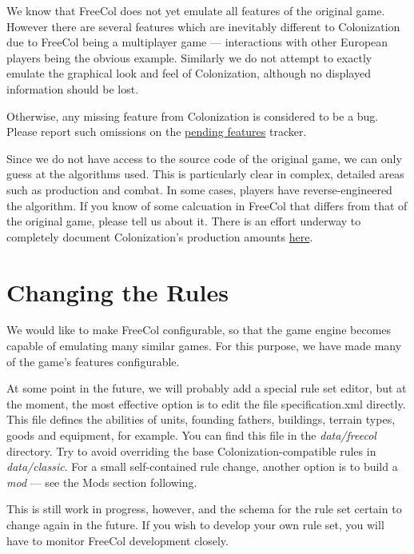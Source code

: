 \documentclass[12pt]{book}
\begin{document}
We know that FreeCol does not yet emulate all features of the original
game.  However there are several features which are inevitably
different to Colonization due to FreeCol being a multiplayer game ---
interactions with other European players being the obvious example.
Similarly we do not attempt to exactly emulate the graphical look and
feel of Colonization, although no displayed information should be lost.

Otherwise, any missing feature from Colonization is considered to be a
bug.  Please report such omissions on the
\href{https://sourceforge.net/p/freecol/pending-features-for-freecol/}{pending
  features} tracker.

Since we do not have access to the source code of the original game,
we can only guess at the algorithms used.  This is particularly clear
in complex, detailed areas such as production and combat.  In some
cases, players have reverse-engineered the algorithm.  If you know of
some calcuation in FreeCol that differs from that of the original
game, please tell us about it.  There is an effort underway to
completely document Colonization's production amounts
\href{https://sourceforge.net/p/freecol/wiki/WWC1D%20-%20resource%20output%20v2/}{here}.


\hypertarget{Changing the Rules}{\chapter{Changing the Rules}}

We would like to make FreeCol configurable, so that the game engine
becomes capable of emulating many similar games. For this purpose,
we have made many of the game's features configurable.

At some point in the future, we will probably add a special rule set
editor, but at the moment, the most effective option is to edit the file
specification.xml directly. This file defines the abilities of units,
founding fathers, buildings, terrain types, goods and equipment, for
example. You can find this file in the \textit{data/freecol}
directory.  Try to avoid overriding the base Colonization-compatible
rules in \textit{data/classic}.  For a small self-contained rule
change, another option is to build a \emph{mod} --- see the Mods
section following.

This is still work in progress, however, and the schema for the rule
set certain to change again in the future. If you wish to develop your
own rule set, you will have to monitor FreeCol development closely.
\end{document}
